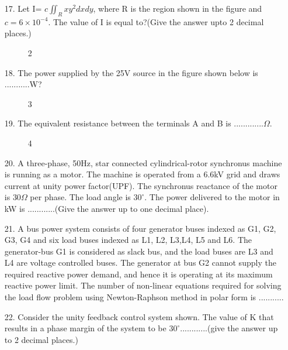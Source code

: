 \documentclass[journal]{IEEEtran}
\begin{document}
\begin{enumerate}
    \item[17.] Let I= $c\iint_R xy^2 dxdy$, where R is the region shown in the figure and $c = 6\times 10^{-4}$. The value of I is equal to?(Give the answer upto 2 decimal places.)
    \begin{figure}[!ht]
        \centering
        \caption{2}
    \end{figure}
    \newpage
    \item[18.] The power supplied by the 25V source in the figure shown below is ...........W?
    \begin{figure}[!ht]
        \centering
        \caption{3}
    \end{figure}
    \item[19.] The equivalent resistance between the terminals A and B is .............$\Omega$.
    \begin{figure}[!ht]
        \centering
        \caption{4}
    \end{figure}
    \item[20.] A three-phase, 50Hz, star connected cylindrical-rotor synchronus machine is running as a motor. The machine is operated from a 6.6kV grid and draws current at unity power factor(UPF). The synchronus reactance of the motor is $30\Omega$ per phase. The load angle is $30^{\circ}$. The power delivered to the motor in kW is ............(Give the answer up to one decimal place).
    \item[21.] A bus power system consists of four generator buses indexed as G1, G2, G3, G4 and six load buses indexed as L1, L2, L3,L4, L5 and L6. The generator-bus G1 is considered as slack bus, and the load buses are L3 and L4 are voltage controlled buses. The generator at bus G2 cannot supply the required reactive power demand, and hence it is operating at its maximum reactive power limit. The number of non-linear equations required for solving the load flow problem using Newton-Raphson method in polar form is ...........
    \item[22.] Consider the unity feedback control system shown. The value of K that results in a phase margin of the system to be $30^{\circ}$............(give the answer up to 2 decimal places.)
    \begin{figure}[!ht]
        \centering

\end{figure}
\end{enumerate}
\end{document}
